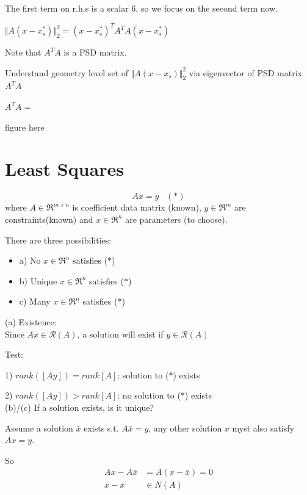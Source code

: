 The first term on r.h.s is a scalar 6, so we focus on the second term now.

$\Vert A(x-x_s^*)\Vert^2_2= (x-x_s^*)^T A^TA (x-x_s^*)$ 

Note that $A^TA$ is a PSD matrix.


Understand geometry level set of $\Vert A(x-x_s)\Vert^2_2$ via eigenvector of PSD matrix $A^TA$


$A^TA=$

figure here






\section{Least Squares}

\begin{equation*}
Ax = y \,\,\,\,\,(*)
\end{equation*}
where $A\in \Re^{m\times n}$ is coefficient data matrix (known), $y\in \Re^m$ are constraints(known) and $x\in \Re^n$ are parameters (to choose).

There are three possibilities:

\begin{itemize}
	\item a) No $x\in \Re^n$ satisfies ($*$)
	
	\item b) Unique $x\in \Re^n$ satisfies ($*$)
	
	\item c) Many $x\in \Re^n$ satisfies ($*$)
\end{itemize}

(a) Existence:\\

Since $Ax\in \mathcal{R}(A)$, a solution will exist if $y\in \mathcal{R}(A)$

Test: 

1) $rank([A y]) = rank[A]$: solution to ($*$) exists

2) $rank([A y]) > rank[A]$: no solution to ($*$) exists\\

(b)/(c) If a solution exists, is it unique?

Assume a solution $\bar{x}$ exists s.t. $A\bar{x} = y$, any other solution $x$ myst also satisfy $Ax = y$. 

So 
\begin{align*}
Ax - A\bar{x} &= A(x -\bar{x}) = 0\\
x - \bar{x} &\in N(A)
\end{align*}

